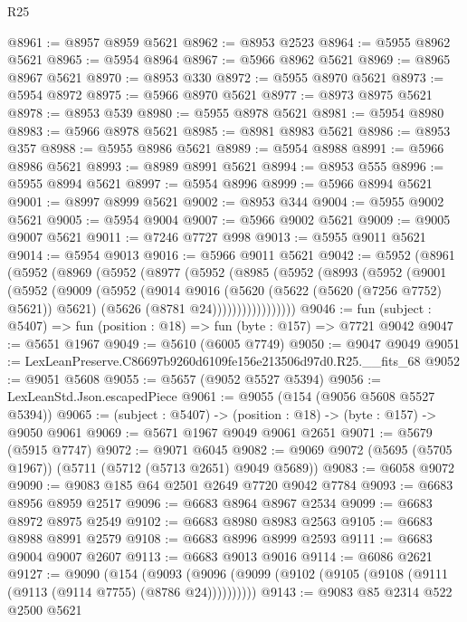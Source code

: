 \begin{lexlean}{R25}
\begin{coremodule}
@8961 := @8957 @8959 @5621
@8962 := @8953 @2523
@8964 := @5955 @8962 @5621
@8965 := @5954 @8964
@8967 := @5966 @8962 @5621
@8969 := @8965 @8967 @5621
@8970 := @8953 @330
@8972 := @5955 @8970 @5621
@8973 := @5954 @8972
@8975 := @5966 @8970 @5621
@8977 := @8973 @8975 @5621
@8978 := @8953 @539
@8980 := @5955 @8978 @5621
@8981 := @5954 @8980
@8983 := @5966 @8978 @5621
@8985 := @8981 @8983 @5621
@8986 := @8953 @357
@8988 := @5955 @8986 @5621
@8989 := @5954 @8988
@8991 := @5966 @8986 @5621
@8993 := @8989 @8991 @5621
@8994 := @8953 @555
@8996 := @5955 @8994 @5621
@8997 := @5954 @8996
@8999 := @5966 @8994 @5621
@9001 := @8997 @8999 @5621
@9002 := @8953 @344
@9004 := @5955 @9002 @5621
@9005 := @5954 @9004
@9007 := @5966 @9002 @5621
@9009 := @9005 @9007 @5621
@9011 := @7246 @7727 @998
@9013 := @5955 @9011 @5621
@9014 := @5954 @9013
@9016 := @5966 @9011 @5621
@9042 := @5952
    (@8961
      (@5952
        (@8969
          (@5952
            (@8977
              (@5952
                (@8985
                  (@5952
                    (@8993
                      (@5952
                        (@9001
                          (@5952
                            (@9009
                              (@5952
                                (@9014
                                  @9016
                                  (@5620 (@5622 (@5620 (@7256 @7752) @5621)) @5621)
                                  (@5626 (@8781 @24)))))))))))))))))
@9046 := fun (subject : @5407) => fun (position : @18) => fun (byte : @157) => @7721 @9042
@9047 := @5651 @1967
@9049 := @5610 (@6005 @7749)
@9050 := @9047 @9049
@9051 := LexLeanPreserve.C86697b9260d6109fe156e213506d97d0.R25.__fits_68
@9052 := @9051 @5608
@9055 := @5657 (@9052 @5527 @5394)
@9056 := LexLeanStd.Json.escapedPiece
@9061 := @9055 (@154 (@9056 @5608 @5527 @5394))
@9065 := (subject : @5407) -> (position : @18) -> (byte : @157) -> @9050 @9061
@9069 := @5671 @1967 @9049 @9061 @2651
@9071 := @5679 (@5915 @7747)
@9072 := @9071 @6045
@9082 := @9069 @9072 (@5695 (@5705 @1967)) (@5711 (@5712 (@5713 @2651) @9049 @5689))
@9083 := @6058 @9072
@9090 := @9083 @185 @64 @2501 @2649 @7720 @9042 @7784
@9093 := @6683 @8956 @8959 @2517
@9096 := @6683 @8964 @8967 @2534
@9099 := @6683 @8972 @8975 @2549
@9102 := @6683 @8980 @8983 @2563
@9105 := @6683 @8988 @8991 @2579
@9108 := @6683 @8996 @8999 @2593
@9111 := @6683 @9004 @9007 @2607
@9113 := @6683 @9013 @9016
@9114 := @6086 @2621
@9127 := @9090
    (@154 (@9093 (@9096 (@9099 (@9102 (@9105 (@9108 (@9111 (@9113 (@9114 @7755) (@8786 @24))))))))))
@9143 := @9083
    @85
    @2314
    @522
    @2500
    @5621

\end{coremodule}
\end{lexlean}

